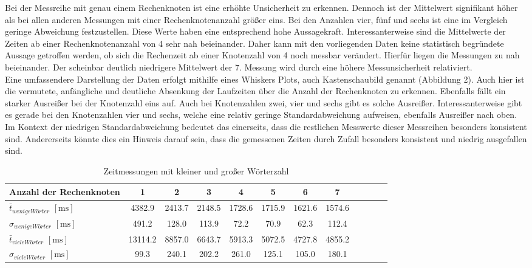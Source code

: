 Bei der Messreihe mit genau einem Rechenknoten ist eine erhöhte Unsicherheit zu erkennen. Dennoch ist der Mittelwert signifikant höher als bei allen anderen 
Messungen mit einer Rechenknotenanzahl größer eins. Bei den Anzahlen vier, fünf und sechs ist eine im Vergleich geringe Abweichung festzustellen. Diese Werte haben eine entsprechend hohe 
Aussagekraft. Interessanterweise sind die Mittelwerte der Zeiten ab einer Rechenknotenanzahl von 4 sehr nah beieinander. Daher kann mit den vorliegenden Daten keine statistisch begründete Aussage getroffen werden, ob sich die Rechenzeit ab einer Knotenzahl von 4 noch messbar verändert. Hierfür liegen die Messungen zu nah beieinander. Der scheinbar deutlich niedrigere Mittelwert der 7. Messung wird durch eine
höhere Messunsicherheit relativiert.
\\
Eine umfassendere Darstellung der Daten erfolgt mithilfe eines Whiskers Plots, auch Kastenschaubild genannt (Abbildung 2). Auch hier ist die vermutete, anfängliche und deutliche 
Absenkung der Laufzeiten über die Anzahl der Rechenknoten zu erkennen. Ebenfalls fällt ein starker Ausreißer bei der Knotenzahl eins auf. Auch bei Knotenzahlen zwei, vier und sechs 
gibt es solche Ausreißer. Interessanterweise gibt es gerade bei den Knotenzahlen vier und sechs, welche eine relativ geringe Standardabweichung aufweisen, ebenfalls Ausreißer nach oben. 
Im Kontext der niedrigen Standardabweichung bedeutet das einerseits, dass die restlichen Messwerte dieser Messreihen besonders konsistent sind. Andererseits könnte dies ein Hinweis darauf sein, dass die gemessenen Zeiten durch Zufall besonders konsistent und niedrig ausgefallen sind.

\begin{table}
	\caption{Zeitmessungen mit kleiner und großer Wörterzahl}
	\label{zeiten_tabelle_lang_und_kurz}
	\begin{tabularx}{\textwidth}{@{}l*{10}{C}c@{}}
		\toprule
		Anzahl der Rechenknoten & 1 & 2 & 3 & 4 & 5 & 6 & 7 \\ 
		\midrule
		$\bar{t}_{wenige Wörter}$ $\mathrm{[ms]}$ & 4382.9 & 2413.7 & 2148.5 & 1728.6 & 1715.9 & 1621.6 & 1574.6 \\
		$\sigma_{wenige Wörter}$ $\mathrm{[ms]}$ & 491.2 & 128.0 & 113.9 & 72.2 & 70.9 & 62.3 & 112.4 \\
		\addlinespace
		$\bar{t}_{viele Wörter}$ $\mathrm{[ms]}$ & 13114.2 & 8857.0 & 6643.7 & 5913.3 & 5072.5 & 4727.8 & 4855.2 \\
		$\sigma_{viele Wörter}$ $\mathrm{[ms]}$ & 99.3 & 240.1 & 202.2 & 261.0 & 125.1 & 105.0 & 180.1 \\
		\bottomrule
	\end{tabularx}
\end{table}

